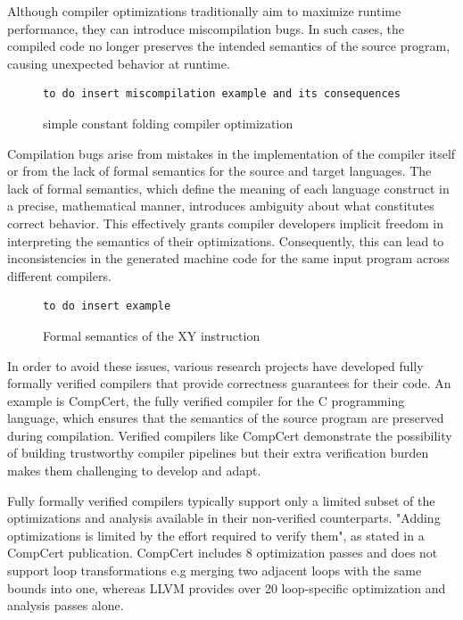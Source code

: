 Although compiler optimizations traditionally aim to maximize runtime performance, they can introduce miscompilation bugs. In such cases, the compiled code no longer preserves the intended semantics of the source program, causing unexpected behavior at runtime.
\begin{figure}
\begin{minipage}{0.45\textwidth}
\begin{lstlisting}
to do insert miscompilation example and its consequences
\end{lstlisting}
\end{minipage}
\caption{simple constant folding compiler optimization}
\label{fig:llvm-constant-folding}
\end{figure}


Compilation bugs arise from mistakes in the implementation of the compiler itself or from the lack of formal semantics for the source and target languages. The lack of formal semantics, which define the meaning of each language construct in a precise, mathematical manner, introduces ambiguity about what constitutes correct behavior. This effectively grants compiler developers implicit freedom in interpreting the semantics of their optimizations. Consequently, this can lead to inconsistencies in the generated machine code for the same input program across different compilers.
\begin{figure}
\begin{minipage}{0.45\textwidth}
\begin{lstlisting}
to do insert example 
\end{lstlisting}
\end{minipage}
\caption{Formal semantics of the XY instruction }
\label{fig:llvm-constant-folding}
\end{figure}

In order to avoid these issues, various research projects have developed fully formally verified compilers that provide correctness guarantees for their code. An example is CompCert, the fully verified compiler for the C programming language, which ensures that the semantics of the source program are preserved during compilation. Verified compilers like CompCert demonstrate the possibility of building trustworthy compiler pipelines but their extra verification burden makes them challenging to develop and adapt. 

Fully formally verified compilers typically support only a limited subset of the optimizations and analysis available in their non-verified counterparts. "Adding optimizations is limited by the effort required to verify them", as stated in a CompCert publication. CompCert includes 8 optimization passes and does not support loop transformations e.g merging two adjacent loops with the same bounds into one, whereas LLVM provides over 20 loop-specific optimization and analysis passes alone.\cite{compcert} 

